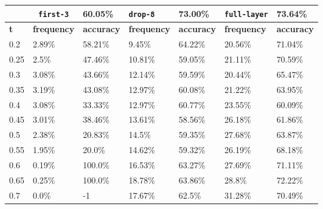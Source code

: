 
\begin{table}[t]
\centering
\begin{tabular}{lllllll} %
\hline

\multicolumn{1}{c}{}& 
\multicolumn{1}{c}{\texttt{first-3}} & \multicolumn{1}{l|}{60.05\%} 
& \multicolumn{1}{l}{\texttt{drop-8}} & \multicolumn{1}{l|}{73.00\%}
& \multicolumn{1}{l}{\texttt{full-layer}} & 73.64\%
\\ \hline
\multicolumn{1}{l|}{\textbf{t}} &
\multicolumn{1}{l|}{\textbf{frequency}} & 
\multicolumn{1}{l|}{\textbf{accuracy}} & 
\multicolumn{1}{l|}{\textbf{frequency}} & 
\multicolumn{1}{l|}{\textbf{accuracy}} & 
\multicolumn{1}{l|}{\textbf{frequency}} & 
\multicolumn{1}{l|}{\textbf{accuracy}} \\ \hline
	\multicolumn{1}{l|}{0.2}&  2.89\% & \multicolumn{1}{l|}{58.21\%}& 9.45\% & \multicolumn{1}{l|}{64.22\%}& 20.56\% & 71.04\%\\ 
\multicolumn{1}{l|}{0.25}&  2.5\% & \multicolumn{1}{l|}{47.46\%}& 10.81\% & \multicolumn{1}{l|}{59.05\%}& 21.11\% & 70.59\%\\ 
\multicolumn{1}{l|}{0.3}&  3.08\% & \multicolumn{1}{l|}{43.66\%}& 12.14\% & \multicolumn{1}{l|}{59.59\%}& 20.44\% & 65.47\%\\ 
\multicolumn{1}{l|}{0.35}&  3.19\% & \multicolumn{1}{l|}{43.08\%}& 12.97\% & \multicolumn{1}{l|}{60.08\%}& 21.22\% & 63.95\%\\ 
\multicolumn{1}{l|}{0.4}&  3.08\% & \multicolumn{1}{l|}{33.33\%}& 12.97\% & \multicolumn{1}{l|}{60.77\%}& 23.55\% & 60.09\%\\ 
\multicolumn{1}{l|}{0.45}&  3.01\% & \multicolumn{1}{l|}{38.46\%}& 13.61\% & \multicolumn{1}{l|}{58.56\%}& 26.18\% & 61.86\%\\ 
\multicolumn{1}{l|}{0.5}&  2.38\% & \multicolumn{1}{l|}{20.83\%}& 14.5\% & \multicolumn{1}{l|}{59.35\%}& 27.68\% & 63.87\%\\ 
\multicolumn{1}{l|}{0.55}&  1.95\% & \multicolumn{1}{l|}{20.0\%}& 14.62\% & \multicolumn{1}{l|}{59.32\%}& 26.19\% & 68.18\%\\ 
\multicolumn{1}{l|}{0.6}&  0.19\% & \multicolumn{1}{l|}{100.0\%}& 16.53\% & \multicolumn{1}{l|}{63.27\%}& 27.69\% & 71.11\%\\ 
\multicolumn{1}{l|}{0.65}&  0.25\% & \multicolumn{1}{l|}{100.0\%}& 18.78\% & \multicolumn{1}{l|}{63.86\%}& 28.8\% & 72.22\%\\ 
\multicolumn{1}{l|}{0.7}&  0.0\% & \multicolumn{1}{l|}{-1}& 17.67\% & \multicolumn{1}{l|}{62.5\%}& 31.28\% & 70.49\%\\ 

\end{tabular}
\end{table}
